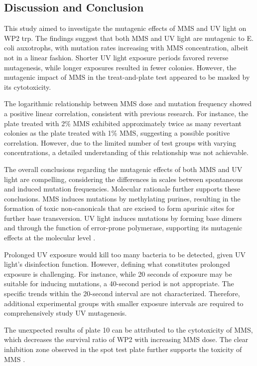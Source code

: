 \documentclass[a4paper,10pt]{article}
\begin{document}
\begin{multicols}{2}
\section{Discussion and Conclusion}


This study aimed to investigate the mutagenic effects of MMS and UV light on WP2 trp. The findings suggest that both MMS and UV light are mutagenic to E. coli auxotrophs, with mutation rates increasing with MMS concentration, albeit not in a linear fashion. Shorter UV light exposure periods favored reverse mutagenesis, while longer exposures resulted in fewer colonies. However, the mutagenic impact of MMS in the treat-and-plate test appeared to be masked by its cytotoxicity.

The logarithmic relationship between MMS dose and mutation frequency showed a positive linear correlation, consistent with previous research. For instance, the plate treated with 2\% MMS exhibited approximately twice as many revertant colonies as the plate treated with 1\% MMS, suggesting a possible positive correlation. However, due to the limited number of test groups with varying concentrations, a detailed understanding of this relationship was not achievable.

The overall conclusions regarding the mutagenic effects of both MMS and UV light are compelling, considering the differences in scales between spontaneous and induced mutation frequencies. Molecular rationale further supports these conclusions. MMS induces mutations by methylating purines, resulting in the formation of toxic non-canonicals that are excised to form apurinic sites for further base transversion. UV light induces mutations by forming base dimers and through the function of error-prone polymerase, supporting its mutagenic effects at the molecular level \cite{ikehata2011mechanisms}.

Prolonged UV exposure would kill too many bacteria to be detected, given UV light's disinfection function. However, defining what constitutes prolonged exposure is challenging. For instance, while 20 seconds of exposure may be suitable for inducing mutations, a 40-second period is not appropriate. The specific trends within the 20-second interval are not characterized. Therefore, additional experimental groups with smaller exposure intervals are required to comprehensively study UV mutagenesis.

The unexpected results of plate 10 can be attributed to the cytotoxicity of MMS, which decreases the survival ratio of WP2 with increasing MMS dose. The clear inhibition zone observed in the spot test plate further supports the toxicity of MMS \cite{green1976mutagen}.




\end{multicols}

\end{document}
